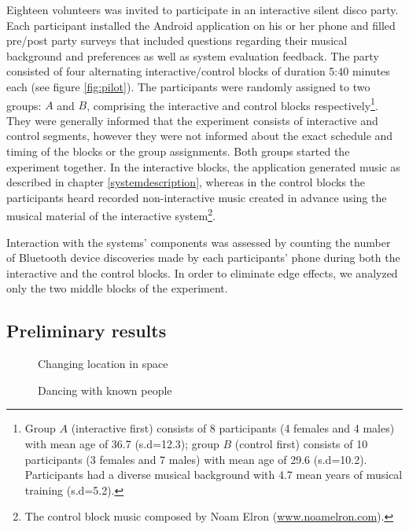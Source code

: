 \documentclass[a4paper,11pt]{article}
\begin{document}
{Eighteen volunteers was invited to participate in an interactive silent disco party.
Each participant installed the Android application on his or her phone and filled pre/post party surveys that included questions regarding their musical background and preferences as well as system evaluation feedback.
The party consisted of four alternating interactive/control blocks of duration 5:40 minutes each (see figure \ref{fig:pilot}).
The participants were randomly assigned to two groups: $A$ and $B$, comprising the interactive and control blocks respectively\footnote{Group $A$ (interactive first) consists of 8 participants (4 females and 4 males) with mean age of 36.7 (s.d=12.3); group $B$ (control first) consists of 10 participants (3 females and 7 males) with mean age of 29.6 (s.d=10.2). Participants had a diverse musical background with 4.7 mean years of musical training (s.d=5.2).}.
They were generally informed that the experiment consists of interactive and control segments, however they were not informed about the exact schedule and timing of the blocks or the group assignments.
Both groups started the experiment together.
In the interactive blocks, the application generated music as described in chapter \ref{systemdescription}, whereas in the control blocks the participants heard recorded non-interactive music created in advance using the musical material of the interactive system\footnote{The control block music composed by Noam Elron (\href{http://www.noamelron.com}{www.noamelron.com}).}.

Interaction with the systems' components was assessed by counting the number of Bluetooth device discoveries made by each participants' phone during both the interactive and the control blocks.
In order to eliminate edge effects, we analyzed only the two middle blocks of the experiment.

\subsection{Preliminary results}

\begin{figure}[!htb]
	\def\svgwidth{0.95\columnwidth}
  	
	\caption{Changing location in space}\label{fig:location}
\endminipage\hfill
{}
	\def\svgwidth{0.95\columnwidth}
	
	\caption{Dancing with known people}\label{fig:known}
\endminipage\hfill
\end{figure}

}
\end{document}
